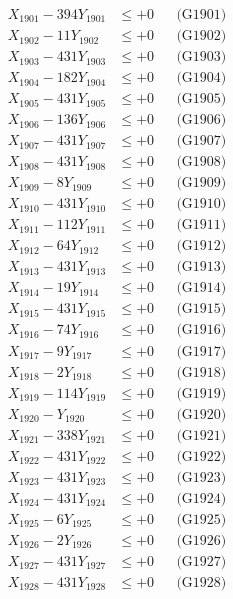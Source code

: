 \documentclass[a4paper,10pt]{article}
\begin{document}
{\begin{align}
\allowbreak
X_{1901} - 394Y_{1901} &\leq +0 && \text{(G1901)} \\
X_{1902} - 11Y_{1902} &\leq +0 && \text{(G1902)} \\
X_{1903} - 431Y_{1903} &\leq +0 && \text{(G1903)} \\
X_{1904} - 182Y_{1904} &\leq +0 && \text{(G1904)} \\
X_{1905} - 431Y_{1905} &\leq +0 && \text{(G1905)} \\
X_{1906} - 136Y_{1906} &\leq +0 && \text{(G1906)} \\
X_{1907} - 431Y_{1907} &\leq +0 && \text{(G1907)} \\
X_{1908} - 431Y_{1908} &\leq +0 && \text{(G1908)} \\
X_{1909} - 8Y_{1909} &\leq +0 && \text{(G1909)} \\
X_{1910} - 431Y_{1910} &\leq +0 && \text{(G1910)} \\
\allowbreak
X_{1911} - 112Y_{1911} &\leq +0 && \text{(G1911)} \\
X_{1912} - 64Y_{1912} &\leq +0 && \text{(G1912)} \\
X_{1913} - 431Y_{1913} &\leq +0 && \text{(G1913)} \\
X_{1914} - 19Y_{1914} &\leq +0 && \text{(G1914)} \\
X_{1915} - 431Y_{1915} &\leq +0 && \text{(G1915)} \\
X_{1916} - 74Y_{1916} &\leq +0 && \text{(G1916)} \\
X_{1917} - 9Y_{1917} &\leq +0 && \text{(G1917)} \\
X_{1918} - 2Y_{1918} &\leq +0 && \text{(G1918)} \\
X_{1919} - 114Y_{1919} &\leq +0 && \text{(G1919)} \\
X_{1920} - Y_{1920} &\leq +0 && \text{(G1920)} \\
\allowbreak
X_{1921} - 338Y_{1921} &\leq +0 && \text{(G1921)} \\
X_{1922} - 431Y_{1922} &\leq +0 && \text{(G1922)} \\
X_{1923} - 431Y_{1923} &\leq +0 && \text{(G1923)} \\
X_{1924} - 431Y_{1924} &\leq +0 && \text{(G1924)} \\
X_{1925} - 6Y_{1925} &\leq +0 && \text{(G1925)} \\
X_{1926} - 2Y_{1926} &\leq +0 && \text{(G1926)} \\
X_{1927} - 431Y_{1927} &\leq +0 && \text{(G1927)} \\
X_{1928} - 431Y_{1928} &\leq +0 && \text{(G1928)} \\

\end{align}}
\end{document}
